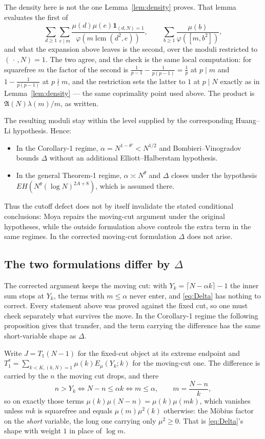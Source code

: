 \documentclass[11pt,a4paper]{article}
\theoremstyle{plain}
\theoremstyle{definition}
\theoremstyle{remark}
\newcommand{\AAA}{\mathfrak{A}}
\newcommand{\Emu}{E_\mu}
\DeclareMathOperator{\lcm}{lcm}
\begin{document}
The density here is not the one Lemma~\ref{lem:density} proves. That
lemma evaluates the first of
\[
  \sum_{d\ge1}\sum_{e\mid m}
    \frac{\mu(d)\mu(e)\mathbf 1_{(d,N)=1}}{\varphi(m\lcm(d^2,e))},
  \qquad
  \sum_{b\ge1}\frac{\mu(b)}{\varphi([m,b^2])},
\]
and what the expansion above leaves is the second, over the moduli
restricted to $(\,\cdot\,,N)=1$. The two agree, and the check is the same local
computation: for squarefree $m$ the factor of the second is
$\tfrac{1}{p-1}-\tfrac{1}{p(p-1)}=\tfrac1p$ at $p\mid m$ and
$1-\tfrac{1}{p(p-1)}$ at $p\nmid m$, and the restriction sets the
latter to $1$ at $p\mid N$ exactly as in Lemma~\ref{lem:density} ---
the same coprimality point used above. The
product is $\AAA(N)\lambda(m)/m$, as written.

The resulting moduli stay within the level supplied by the
corresponding Huang--Li hypothesis. Hence:
\begin{itemize}
\item In the Corollary-1 regime, $\alpha=N^{1-\theta'}<N^{1/2}$ and
  Bombieri--Vinogradov bounds $\Delta$ without an additional
  Elliott--Halberstam hypothesis.
\item In the general Theorem-1 regime, $\alpha\asymp N^{\theta}$ and
  $\Delta$ closes under the hypothesis
  $EH(N^{\theta}(\log N)^{2A+8})$, which is assumed there.
\end{itemize}
Thus the cutoff defect does not by itself invalidate the stated
conditional conclusions: Moya repairs the moving-cut argument under the
original hypotheses, while the outside formulation above controls the
extra term in the same regimes.  In the corrected moving-cut formulation
$\Delta$ does not arise.

\subsection{The two formulations differ by \texorpdfstring{$\Delta$}%
{Delta}}\label{sec:movingcut}

The corrected argument keeps the moving cut: with
$Y_k=\lceil N-\alpha k\rceil-1$ the inner sum stops at $Y_k$, the terms
with $m\le\alpha$ never enter, and \eqref{eq:Delta} has nothing to
correct. Every statement above was proved against the fixed cut, so one must
check separately what survives the move.  In the Corollary-1 regime the
following proposition gives that transfer, and the term carrying the
difference has the same short-variable shape as $\Delta$.

Write $J=T_1(N-1)$ for the fixed-cut object at its extreme endpoint and
$T_1^\ast=\sum_{k<K,(k,N)=1}\mu(k)\Emu(Y_k;k)$ for the moving-cut one.
The difference is carried by the $n$ the moving cut drops, and there
\[
  n>Y_k \iff N-n\le\alpha k \iff m\le\alpha,
  \qquad m=\frac{N-n}{k},
\]
so on exactly those terms $\mu(k)\mu(N-n)=\mu(k)\mu(mk)$, which
vanishes unless $mk$ is squarefree and equals $\mu(m)\mu^2(k)$
otherwise: the M\"obius factor on the \emph{short} variable, the long
one carrying only $\mu^2\ge0$. That is \eqref{eq:Delta}'s shape with
weight $1$ in place of $\log m$.
\end{document}
